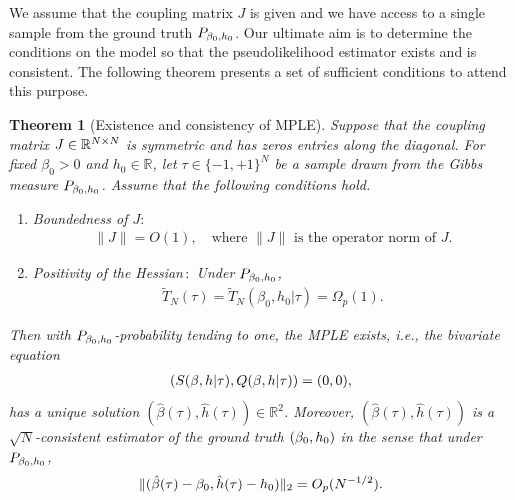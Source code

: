 \documentclass[letterpaper,11pt,reqno]{amsart}
\newtheorem{thm}{Theorem}[section]
\newcommand{\mvgt}{{\tau}}
\begin{document}
We assume that the coupling matrix $J$ is given and we have access to a single sample from the ground truth $P_{\beta_0,h_0}$. Our ultimate aim is to determine the conditions on the model so that the pseudolikelihood estimator 
exists and is consistent. The following theorem presents a set of sufficient conditions to attend this purpose. 




\begin{thm}[Existence and consistency of MPLE]\label{thm:exs-cons}
   Suppose that the coupling matrix $J\in \mathbb{R}^{N\times N}$ is symmetric and has zeros entries along the diagonal. For fixed $\beta_0>0$ and $h_0\in \mathbb{R}$, let  $\mvgt\in \{-1,+1\}^N$ be a sample drawn from the Gibbs measure $P_{\beta_0,h_0}$. Assume that the following conditions hold. 
   \begin{enumerate}
     \item[$(i)$]  Boundedness of $J$$:$
     \begin{align*} 
     \| J\|  = O(1), \quad \text{where $\|J\|$ is the operator norm of $J$.}
     \end{align*}
          
    \item[$(ii)$] Positivity of the Hessian\,$:$ Under $P_{\beta_0,h_0}$, 
     \begin{align*} 
     \widetilde{T}_N(\mvgt) =  \widetilde{T}_N(\beta_0, h_0| \mvgt) = \Omega_p(1).
     \end{align*}
   \end{enumerate}
   Then with $P_{\beta_0,h_0}$-probability tending to one, the MPLE exists, i.e., the bivariate equation 
   \begin{align}\label{eq:MPLE}
    (S(\gb,h|\mvgt), Q(\gb,h|\mvgt)) = (0,0),
\end{align}
has a unique solution $(\hat \beta(\mvgt), \hat h(\mvgt))  \in \mathbb{R}^2$. Moreover, $(\hat \beta(\mvgt), \hat h(\mvgt))$ is a $\sqrt{N}$-consistent estimator of the ground truth $(\beta_0,h_0)$ in the sense that under $P_{\beta_0,h_0}$, 
    \[
    \| (\hat{\gb}(\mvgt) - \gb_0, \hat{h}(\mvgt) - h_0) \|_2 = O_p(N^{-1/2}).
    \]
 \end{thm}
\end{document}
